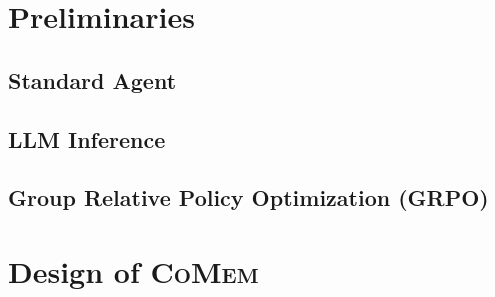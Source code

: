 \documentclass{article}
\theoremstyle{plain}
\theoremstyle{definition}
\theoremstyle{remark}
\newcommand{\model}{\textsc{CoMem}\xspace}
\begin{document}




\section{Preliminaries}

\subsection{Standard Agent}


\subsection{LLM Inference}


\subsection{Group Relative Policy Optimization (GRPO)}


\section{Design of {\model}}
\end{document}

